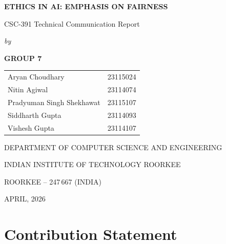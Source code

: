 \documentclass[a4paper,12pt,twoside]{report}
\newcommand{\ThesisTitle}{Ethics in AI: Emphasis on Fairness}
\newcommand{\DegreeType}{CSC-391 Technical Communication Report}
\newcommand{\TeamMembers}{
\begin{tabular}{l l}
Aryan Choudhary             & 23115024 \\
Nitin Agiwal                & 23114074 \\
Pradyuman Singh Shekhawat   & 23115107 \\
Siddharth Gupta             & 23114093 \\
Vishesh Gupta               & 23114107 \\
\end{tabular}
}
\newcommand{\Department}{Department of Computer Science and Engineering}
\newcommand{\Institute}{Indian Institute of Technology Roorkee}
\newcommand{\Address}{Roorkee -- 247\,667 (India)}
\newcommand{\SubmissionMonth}{April, 2026}
\begin{document}

\begin{titlepage}
  \centering
  \vspace*{0.5cm}

  {\bfseries\Large\MakeUppercase{\ThesisTitle}\par}

  \vspace{2.5cm}
  {\DegreeType\par}

  \vspace{0.8cm}
  {\itshape by\par}

  \vspace{2cm}
  {\bfseries\large GROUP 7\par}

  \vspace{0.8cm}
  \TeamMembers

  \vfill

  {\MakeUppercase{\Department}\par
   \MakeUppercase{\Institute}\par
   \MakeUppercase{\Address}\par
   \MakeUppercase{\SubmissionMonth}\par}
\end{titlepage}

\cleardoublepage
\chapter*{Contribution Statement}
\label{ch:contribution_statement}
\end{document}
